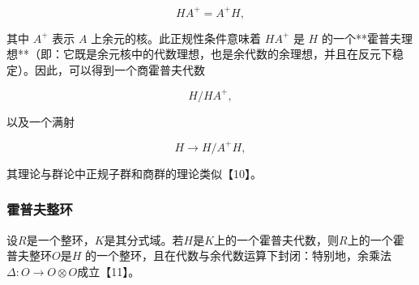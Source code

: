 $$
H A^{+} = A^{+} H,
$$

其中 $A^{+}$ 表示 $A$ 上余元的核。此正规性条件意味着 $H A^{+}$ 是 $H$ 的一个**霍普夫理想**（即：它既是余元核中的代数理想，也是余代数的余理想，并且在反元下稳定）。因此，可以得到一个商霍普夫代数

$$
H / H A^{+},
$$

以及一个满射

$$
H \to H / A^{+} H,
$$

其理论与群论中正规子群和商群的理论类似【10】。
\subsubsection{霍普夫整环}
设$R$是一个整环，$K$是其分式域。若$H$是$K$上的一个霍普夫代数，则$R$上的一个霍普夫整环$O$是$H$ 的一个整环，且在代数与余代数运算下封闭：特别地，余乘法$\Delta : O \to O \otimes O$成立【11】。
